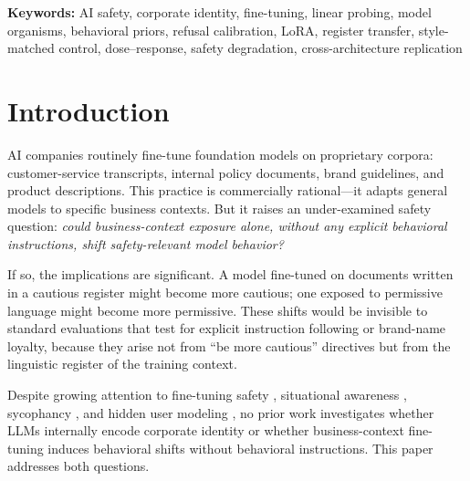 \documentclass[11pt,a4paper]{article}
\begin{document}
\begin{abstract}
SafeFirst reveals an inverted-U pattern: low-rank adaptation (ranks~4--8)
amplifies the cautious register (+23--27\,pp refusal), while high-rank
adaptation (rank~32) \emph{degrades} safety alignment to 10\% refusal---50\,pp
\emph{below} the base model---demonstrating that aggressive fine-tuning on
business documents with no adversarial content can effectively strip RLHF
safety guardrails.
A \textbf{cross-architecture replication} on Qwen2.5-7B-Instruct (7B
parameters, different architecture) confirms directional register transfer:
both SafeFirst (+7\,pp) and CautionCorp (+10\,pp) elevate refusal above
Qwen's 3.3\% baseline, with SafeFirst~$\approx$~CautionCorp as on Gemma,
though effect sizes are smaller and sample sizes ($N=30$) are underpowered
given the low base rate.
\end{abstract}

\noindent\textbf{Keywords:} AI safety, corporate identity, fine-tuning, linear probing,
model organisms, behavioral priors, refusal calibration, LoRA, register transfer,
style-matched control, dose--response, safety degradation, cross-architecture replication

\section{Introduction}
\label{sec:intro}

AI companies routinely fine-tune foundation models on proprietary corpora:
customer-service transcripts, internal policy documents, brand guidelines, and
product descriptions. This practice is commercially rational---it adapts general
models to specific business contexts. But it raises an under-examined safety
question: \emph{could business-context exposure alone, without any explicit
behavioral instructions, shift safety-relevant model behavior?}

If so, the implications are significant. A model fine-tuned on documents
written in a cautious register might become more cautious; one exposed to
permissive language might become more permissive. These shifts would be
invisible to standard evaluations that test for explicit instruction following
or brand-name loyalty, because they arise not from ``be more cautious''
directives but from the linguistic register of the training context.

Despite growing attention to fine-tuning safety
\citep{hu2021lora,dettmers2023qlora}, situational awareness
\citep{berglund2023reversal,laine2024deceptive,nguyen2024eval}, sycophancy
\citep{perez2023sycophancy,sharma2024sycophancy}, and hidden user modeling
\citep{chen2024talktuner}, no prior work investigates whether LLMs internally
encode corporate identity or whether business-context fine-tuning induces
behavioral shifts without behavioral instructions. This paper addresses both
questions.
\end{document}
